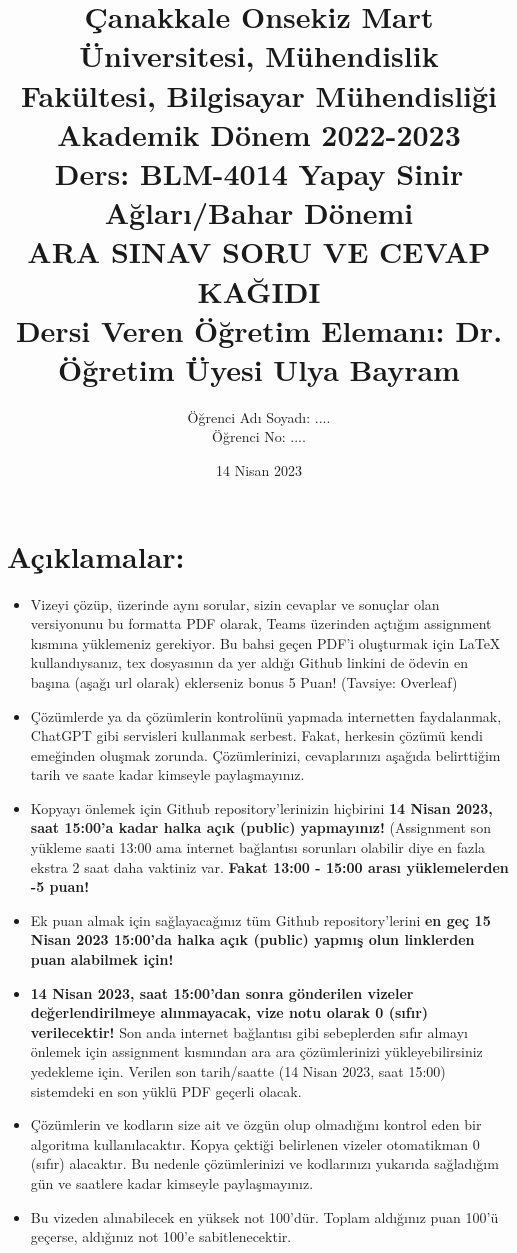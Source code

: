 \documentclass[11pt]{article}
\title{Çanakkale Onsekiz Mart Üniversitesi, Mühendislik Fakültesi, Bilgisayar Mühendisliği Akademik Dönem 2022-2023\\
Ders: BLM-4014 Yapay Sinir Ağları/Bahar Dönemi\\ 
ARA SINAV SORU VE CEVAP KAĞIDI\\
Dersi Veren Öğretim Elemanı: Dr. Öğretim Üyesi Ulya Bayram}
\author{%
\begin{minipage}{\textwidth}
\raggedright
Öğrenci Adı Soyadı: ....\\ %
Öğrenci No: ....
\end{minipage}%
}
\date{14 Nisan 2023}
\begin{document}
\maketitle

\vspace{-.5in}
\section*{Açıklamalar:}
\begin{itemize}
    \item Vizeyi çözüp, üzerinde aynı sorular, sizin cevaplar ve sonuçlar olan versiyonunu bu formatta PDF olarak, Teams üzerinden açtığım assignment kısmına yüklemeniz gerekiyor. Bu bahsi geçen PDF'i oluşturmak için LaTeX kullandıysanız, tex dosyasının da yer aldığı Github linkini de ödevin en başına (aşağı url olarak) eklerseniz bonus 5 Puan! (Tavsiye: Overleaf)
    \item Çözümlerde ya da çözümlerin kontrolünü yapmada internetten faydalanmak, ChatGPT gibi servisleri kullanmak serbest. Fakat, herkesin çözümü kendi emeğinden oluşmak zorunda. Çözümlerinizi, cevaplarınızı aşağıda belirttiğim tarih ve saate kadar kimseyle paylaşmayınız. 
    \item Kopyayı önlemek için Github repository'lerinizin hiçbirini \textbf{14 Nisan 2023, saat 15:00'a kadar halka açık (public) yapmayınız!} (Assignment son yükleme saati 13:00 ama internet bağlantısı sorunları olabilir diye en fazla ekstra 2 saat daha vaktiniz var. \textbf{Fakat 13:00 - 15:00 arası yüklemelerden -5 puan!}
    \item Ek puan almak için sağlayacağınız tüm Github repository'lerini \textbf{en geç 15 Nisan 2023 15:00'da halka açık (public) yapmış olun linklerden puan alabilmek için!}
    \item \textbf{14 Nisan 2023, saat 15:00'dan sonra gönderilen vizeler değerlendirilmeye alınmayacak, vize notu olarak 0 (sıfır) verilecektir!} Son anda internet bağlantısı gibi sebeplerden sıfır almayı önlemek için assignment kısmından ara ara çözümlerinizi yükleyebilirsiniz yedekleme için. Verilen son tarih/saatte (14 Nisan 2023, saat 15:00) sistemdeki en son yüklü PDF geçerli olacak.
    \item Çözümlerin ve kodların size ait ve özgün olup olmadığını kontrol eden bir algoritma kullanılacaktır. Kopya çektiği belirlenen vizeler otomatikman 0 (sıfır) alacaktır. Bu nedenle çözümlerinizi ve kodlarınızı yukarıda sağladığım gün ve saatlere kadar kimseyle paylaşmayınız.
    \item Bu vizeden alınabilecek en yüksek not 100'dür. Toplam aldığınız puan 100'ü geçerse, aldığınız not 100'e sabitlenecektir.

\end{itemize}
\end{document}
